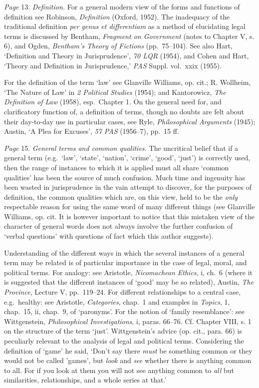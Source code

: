 \emph{Page} 13. \emph{Definition.} For a general modern view of the
forms and functions of definition see Robinson, \emph{Definition}
(Oxford, 1952). The inadequacy of the traditional definition \emph{per
genus et differentiam} as a method of elucidating legal terms is
discussed by Bentham, \emph{Fragment on Government} (notes to Chapter V,
s. 6), and Ogden, \emph{Bentham's Theory of Fictions} (pp.~75--104). See
also Hart, `Definition and Theory in Jurisprudence', \emph{70 LQR}
(1954), and Cohen and Hart, `Theory and Definition in Jurisprudence,'
\emph{PAS} Suppl. vol.~xxix (1955).

For the definition of the term `law' see Glanville Williams, op. cit.;
R. Wollheim, `The Nature of Law' in \emph{2 Political Studies} (1954);
and Kantorowicz, \emph{The Definition of Law} (1958), esp.~Chapter 1. On
the general need for, and clarificatory function of, a definition of
terms, though no doubts are felt about their day-to-day use in
particular cases, see Ryle, \emph{Philosophical Arguments} (1945);
Austin, `A Plea for Excuses', \emph{57 PAS} (1956--7), pp.~15 ff.

\emph{Page} 15. \emph{General terms and common qualities.} The
uncritical belief that if a general term (e.g.~`law', `state', `nation',
`crime', `good', `just') is correctly used, then the range of instances
to which it is applied must all share `common qualities' has been the
source of much confusion. Much time and ingenuity has been wasted in
jurisprudence in the vain attempt to discover, for the purposes of
definition, the common qualities which are, on this view, held to be the
\emph{only} respectable reason for using the same word of many different
things (see Glanville Williams, op. cit. It is however important to
notice that this mistaken view of the character of general words does
not always involve the further confusion of `verbal questions' with
questions of fact which this author suggests).

Understanding of the different ways in which the several instances of a
general term may be related is of particular importance in the case of
legal, moral, and political terms. For analogy: see Aristotle,
\emph{Nicomachean Ethics}, i, ch.~6 (where it is suggested that the
different instances of `good' may be so related), Austin, \emph{The
Province}, Lecture V, pp.~119--24. For different relationships to a
central case, e.g.~healthy: see Aristotle, \emph{Categories}, chap.~1
and examples in \emph{Topics}, 1, chap.~15, ii, chap.~9, of `paronyms'.
For the notion of `family resemblance': see Wittgenstein,
\emph{Philosophical Investigations}, i, paras. 66--76. Cf. Chapter VIII,
s. 1 on the structure of the term `just'. Wittgenstein's advice (op.
cit., para. 66) is peculiarly relevant to the analysis of legal and
political terms. Considering the definition of `game' he said, `Don't
say there \emph{must} be something common or they would not be called
'games', but \emph{look} and \emph{see} whether there is anything common
to all. For if you look at them you will not see anything common to
\emph{all} but similarities, relationships, and a whole series at that.'


